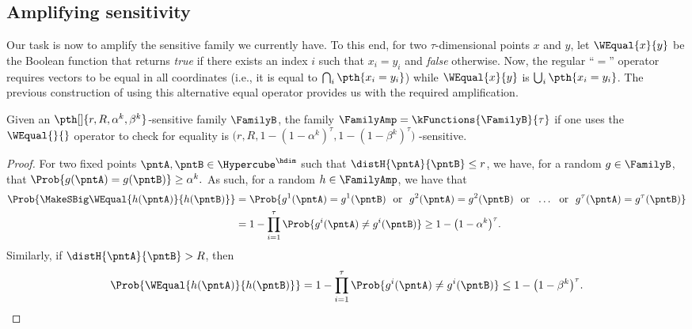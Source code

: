 \subsection{Amplifying sensitivity}

Our task is now to amplify the sensitive family we currently have. To
this end, for two $\tau$-dimensional points $x$ and $y$, let
$\WEqual{x}{y}$ be the Boolean function that returns \emph{true} if
there exists an index $i$ such that $x_i = y_i$ and \emph{false}
otherwise. Now, the regular ``$=$'' operator requires vectors to be
equal in all coordinates (i.e., it is equal to
$\bigcap_{i} \pth{x_i = y_i}$) while $\WEqual{x}{y}$ is
$\bigcup_i \pth{x_i = y_i}$. The previous construction of
 using this alternative equal operator provides us
with the required amplification.

\begin{lemma}
    Given an $\pth[]{r, R, \alpha^k, \beta^k}$-sensitive family
    $\FamilyB$, the family $\FamilyAmp = \kFunctions{\FamilyB}{\tau}$
    if one uses the $\WEqual{}{}$ operator to check for equality is
    \begin{math}
        \bigl(r, R, 1 - (1-\alpha^k)^\tau, 1 - (1-\beta^k)^\tau\bigr)
    \end{math}%
    -sensitive.
\end{lemma}
\begin{proof}
    For two fixed points $\pntA, \pntB \in \Hypercube^\hdim$ such that
    $\distH{\pntA}{\pntB} \leq r$, we have, for a random
    $g \in \FamilyB$, that
    \begin{math}
        \Prob{g(\pntA) = g(\pntB) } \allowbreak \geq \alpha^k.
    \end{math}
     As such,
    for a random $h \in \FamilyAmp$, we have that
    \begin{align*}
      \Prob{\MakeSBig \WEqual{h(\pntA)}{ h(\pntB) }}%
      &= \Prob{ g^1(\pntA) = g^1(\pntB) \text{~ or ~} g^2(\pntA) =
        g^2(\pntB) \text{~ or ~} \ldots \text{~ or ~} g^\tau(\pntA)
        = g^\tau(\pntB)}%
      \\
      &=%
        1 - \prod_{i=1}^\tau \Prob{g^i(\pntA) \neq g^i(\pntB)}
        \geq%
        1 - \bigl(1-\alpha^k\bigr)^\tau.
    \end{align*}
    Similarly, if $\distH{\pntA}{\pntB} > R$, then
    \begin{align*}
      \Prob{\bigl. \WEqual{h(\pntA)}{ h(\pntB)} }%
      =%
      1 - \prod_{i=1}^\tau \Prob{g^i(\pntA) \neq g^i(\pntB)} \leq 1
      - \bigl(1 - \beta^k \bigr)^\tau.
    \end{align*}
\end{proof}

